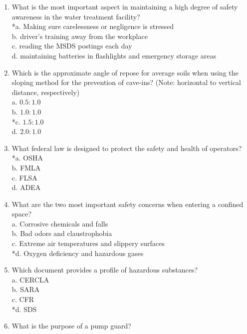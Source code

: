 \begin{enumerate}[1.]
\item What is the most important aspect in maintaining a high degree of safety awareness in the water treatment facility?\\
*a. Making sure carelessness or negligence is stressed\\
b. driver's training away from the workplace\\
c. reading the MSDS postings each day\\
d. maintaining batteries in flashlights and emergency storage areas\\
\item Which is the approximate angle of repose for average soils when using the sloping method for the prevention of cave-ins? (Note: horizontal to vertical distance, respectively)\\
a. $0.5: 1.0$\\
b. $1.0: 1.0$\\
*c. $1.5: 1.0$\\
d. $2.0: 1.0$\\
\item What federal law is designed to protect the safety and health of operators?\\
*a. OSHA\\
b. FMLA\\
c. FLSA\\
d. ADEA\\
\item What are the two most important safety concerns when entering a confined space?\\
a. Corrosive chemicals and falls\\
b. Bad odors and claustrophobia\\
c. Extreme air temperatures and slippery surfaces\\
*d. Oxygen deficiency and hazardous gases\\
\item Which document provides a profile of hazardous substances?\\
a. CERCLA\\
b. SARA\\
c. CFR\\
*d. SDS\\
\item What is the purpose of a pump guard?\\

\end{enumerate}
